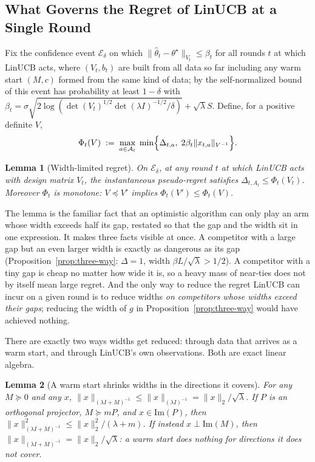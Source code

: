 \documentclass{article}
\newtheorem{lemma}{Lemma}
\theoremstyle{definition}
\theoremstyle{remark}
\theoremstyle{remark}
\begin{document}
\subsection{What Governs the Regret of LinUCB at a Single Round}
\label{sec:width}

Fix the confidence event $\mathcal E_\delta$ on which
$\|\widehat\theta_t-\theta^\star\|_{V_t}\le\beta_t$ for all rounds $t$ at
which LinUCB acts, where $(V_t,b_t)$ are built from all data so far including
any warm start $(M,c)$ formed from the same kind of data; by the
self-normalized bound of \cite{abbasi2011improved} this event has probability
at least $1-\delta$ with
$\beta_t=\sigma\sqrt{2\log(\det(V_t)^{1/2}\det(\lambda I)^{-1/2}/\delta)}+\sqrt\lambda S$.
Define, for a positive definite $V$,
\begin{equation}
\label{eq:phi}
\Phi_t(V)\;:=\;\max_{a\in\mathcal A_t}\;\min\Bigl\{\Delta_{t,a},\;2\beta_t\|x_{t,a}\|_{V^{-1}}\Bigr\}.
\end{equation}

\begin{lemma}[Width-limited regret]
\label{lem:width-limited}
On $\mathcal E_\delta$, at any round $t$ at which LinUCB acts with design
matrix $V_t$, the instantaneous pseudo-regret satisfies
$\Delta_{t,A_t}\le\Phi_t(V_t)$. Moreover $\Phi_t$ is monotone: $V\preceq V'$
implies $\Phi_t(V')\le\Phi_t(V)$.
\end{lemma}

The lemma is the familiar fact that an optimistic algorithm can only play an
arm whose width exceeds half its gap, restated so that the gap and the width
sit in one expression. It makes three facts visible at once. A competitor with
a large gap but an even larger width is exactly as dangerous as its gap
(Proposition~\ref{prop:three-way}: $\Delta=1$, width $\beta L/\sqrt\lambda>1/2$).
A competitor with a tiny gap is cheap no matter how wide it is, so a heavy
mass of near-ties does not by itself mean large regret. And the only way to
reduce the regret LinUCB can incur on a given round is to reduce widths
\emph{on competitors whose widths exceed their gaps}; reducing the width of
$g$ in Proposition~\ref{prop:three-way} would have achieved nothing.

There are exactly two ways widths get reduced: through data that arrives as a
warm start, and through LinUCB's own observations. Both are exact linear
algebra.

\begin{lemma}[A warm start shrinks widths in the directions it covers]
\label{lem:loewner}
For any $M\succeq0$ and any $x$, $\|x\|_{(\lambda I+M)^{-1}}\le\|x\|_{(\lambda I)^{-1}}=\|x\|_2/\sqrt\lambda$.
If $P$ is an orthogonal projector, $M\succeq mP$, and $x\in\mathrm{Im}(P)$, then
$\|x\|^2_{(\lambda I+M)^{-1}}\le\|x\|_2^2/(\lambda+m)$. If instead $x\perp\mathrm{Im}(M)$,
then $\|x\|_{(\lambda I+M)^{-1}}=\|x\|_2/\sqrt\lambda$: a warm start does nothing
for directions it does not cover.
\end{lemma}
\end{document}
